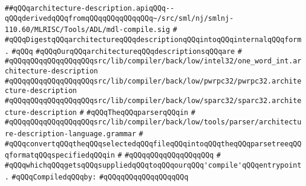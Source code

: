 \label{src/lib/compiler/back/low/tools/arch/architecture-description.api}
\verb|##qQQqarchitecture-description.apiqQQq--qQQqderivedqQQqfromqQQqqQQqqQQqqQQq~/src/sml/nj/smlnj-110.60/MLRISC/Tools/ADL/mdl-compile.sig|\newline
\verb|#|\newline
\verb|#qQQqDigestqQQqarchitectureqQQqdescriptionqQQqintoqQQqinternalqQQqform.|\newline
\verb|#qQQq|\newline
\verb|#qQQqOurqQQqarchitectureqQQqdescriptionsqQQqare|\newline
\verb|#|\newline
\verb|#qQQqqQQqqQQqqQQqqQQqsrc/lib/compiler/back/low/intel32/one_word_int.architecture-description|\newline
\verb|#qQQqqQQqqQQqqQQqqQQqsrc/lib/compiler/back/low/pwrpc32/pwrpc32.architecture-description|\newline
\verb|#qQQqqQQqqQQqqQQqqQQqsrc/lib/compiler/back/low/sparc32/sparc32.architecture-description|\newline
\verb|#|\newline
\verb|#qQQqTheqQQqparserqQQqin|\newline
\verb|#|\newline
\verb|#qQQqqQQqqQQqqQQqqQQqsrc/lib/compiler/back/low/tools/parser/architecture-description-language.grammar|\newline
\verb|#|\newline
\verb|#qQQqconvertqQQqtheqQQqselectedqQQqfileqQQqintoqQQqtheqQQqparsetreeqQQqformatqQQqspecifiedqQQqin|\newline
\verb|#|\newline
\verb|#qQQqqQQqqQQqqQQqqQQq|\newline
\verb|#|\newline
\verb|#qQQqwhichqQQqgetsqQQqsuppliedqQQqtoqQQqourqQQq'compile'qQQqentrypoint.|\newline
\newline
\verb|#qQQqCompiledqQQqby:|\newline
\verb|#qQQqqQQqqQQqqQQqqQQq|\newline
\newline
\newline
